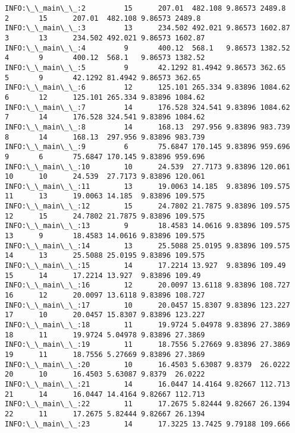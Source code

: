\documentclass[11pt]{article}
\begin{document}
    
    \begin{Verbatim}[commandchars=\\\{\}]
INFO:\_\_main\_\_:2         15      207.01  482.108 9.86573 2489.8
2       15      207.01  482.108 9.86573 2489.8
INFO:\_\_main\_\_:3         13      234.502 492.021 9.86573 1602.87
3       13      234.502 492.021 9.86573 1602.87
INFO:\_\_main\_\_:4         9       400.12  568.1   9.86573 1382.52
4       9       400.12  568.1   9.86573 1382.52
INFO:\_\_main\_\_:5         9       42.1292 81.4942 9.86573 362.65
5       9       42.1292 81.4942 9.86573 362.65
INFO:\_\_main\_\_:6         12      125.101 265.334 9.83896 1084.62
6       12      125.101 265.334 9.83896 1084.62
INFO:\_\_main\_\_:7         14      176.528 324.541 9.83896 1084.62
7       14      176.528 324.541 9.83896 1084.62
INFO:\_\_main\_\_:8         14      168.13  297.956 9.83896 983.739
8       14      168.13  297.956 9.83896 983.739
INFO:\_\_main\_\_:9         6       75.6847 170.145 9.83896 959.696
9       6       75.6847 170.145 9.83896 959.696
INFO:\_\_main\_\_:10        10      24.539  27.7173 9.83896 120.061
10      10      24.539  27.7173 9.83896 120.061
INFO:\_\_main\_\_:11        13      19.0063 14.185  9.83896 109.575
11      13      19.0063 14.185  9.83896 109.575
INFO:\_\_main\_\_:12        15      24.7802 21.7875 9.83896 109.575
12      15      24.7802 21.7875 9.83896 109.575
INFO:\_\_main\_\_:13        9       18.4583 14.0616 9.83896 109.575
13      9       18.4583 14.0616 9.83896 109.575
INFO:\_\_main\_\_:14        13      25.5088 25.0195 9.83896 109.575
14      13      25.5088 25.0195 9.83896 109.575
INFO:\_\_main\_\_:15        14      17.2214 13.927  9.83896 109.49
15      14      17.2214 13.927  9.83896 109.49
INFO:\_\_main\_\_:16        12      20.0097 13.6118 9.83896 108.727
16      12      20.0097 13.6118 9.83896 108.727
INFO:\_\_main\_\_:17        10      20.0457 15.8307 9.83896 123.227
17      10      20.0457 15.8307 9.83896 123.227
INFO:\_\_main\_\_:18        11      19.9724 5.04978 9.83896 27.3869
18      11      19.9724 5.04978 9.83896 27.3869
INFO:\_\_main\_\_:19        11      18.7556 5.27669 9.83896 27.3869
19      11      18.7556 5.27669 9.83896 27.3869
INFO:\_\_main\_\_:20        10      16.4503 5.63087 9.8379  26.0222
20      10      16.4503 5.63087 9.8379  26.0222
INFO:\_\_main\_\_:21        14      16.0447 14.4164 9.82667 112.713
21      14      16.0447 14.4164 9.82667 112.713
INFO:\_\_main\_\_:22        11      17.2675 5.82444 9.82667 26.1394
22      11      17.2675 5.82444 9.82667 26.1394
INFO:\_\_main\_\_:23        14      17.3225 13.7425 9.79188 109.666

\end{Verbatim}
\end{document}
